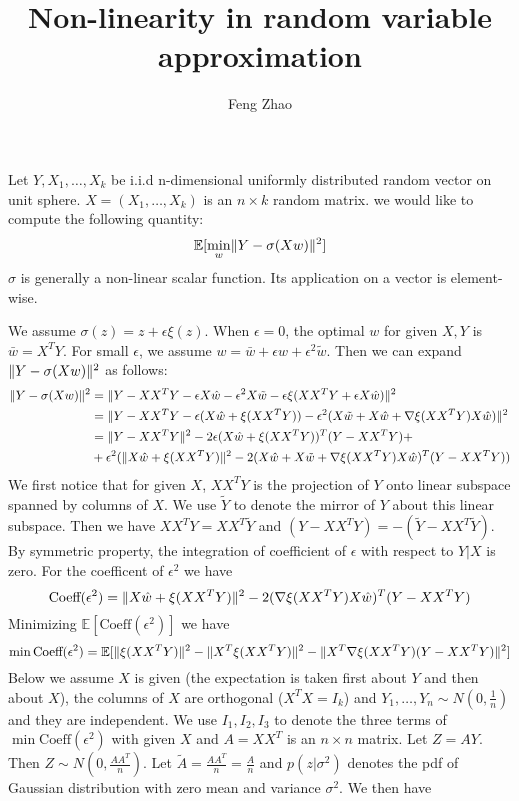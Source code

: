 \documentclass{article}
\title{Non-linearity in random variable approximation}
\author{Feng Zhao}
\DeclarePairedDelimiter\norm{\lVert}{\rVert}
\def\E{\mathbb{E}}
\begin{document}
\maketitle
Let $Y, X_1, \dots, X_k$ be i.i.d n-dimensional uniformly distributed random vector on unit sphere. $X=(X_1, \dots, X_k)$ is an $n\times k$ random matrix. we would like to compute the following quantity:
\begin{equation}
\E[\min_w \norm{Y - \sigma (X w ) }^2]
\end{equation}
$\sigma$ is generally a non-linear scalar function. Its application on a vector is element-wise.

We assume $\sigma(z) = z + \epsilon \xi(z)$. When $\epsilon = 0$, the optimal $w$ for given $X, Y$ is 
$\bar{w} = X^T Y $. For small $\epsilon$, we assume $ w = \bar{w} + \epsilon \hat{w} + \epsilon^2 \tilde{w}$. Then we can expand $\norm{Y - \sigma (X w ) }^2$ as follows:
\begin{align*}
\norm{Y - \sigma (X w ) }^2 & = \norm{Y - XX^T Y - \epsilon X \hat{w} - \epsilon^2 X \tilde{w} - \epsilon \xi(XX^T Y + \epsilon X\hat{w}) }^2 \\
& = \norm{ Y - XX^T Y - \epsilon (X\hat{w} + \xi(XX^T Y)) - \epsilon^2(X\tilde{w} + X\hat{w} + \nabla \xi(XX^TY)X\hat{w})}^2 \\
& = \norm{Y-XX^T Y }^2 - 2 \epsilon (X \hat{w} + \xi(XX^TY))^T (Y-XX^TY) +\\
& +\epsilon^2(\norm{X\hat{w} + \xi(XX^TY)}^2 - 2 (X\hat{w} + X \tilde{w}+ \nabla \xi(XX^TY)X\hat{w})^T(Y-XX^TY))
\end{align*}
We first notice that for given $X$, $XX^TY$ is the projection of $Y$ onto linear subspace spanned by columns of $X$. We use $\tilde{Y}$ to denote the mirror of $Y$ about this linear subspace. Then we have
$XX^T Y = XX^T \tilde{Y}$ and $(Y- XX^TY) = -(\tilde{Y} - XX^T \tilde{Y})$. By symmetric property, the integration of coefficient of $\epsilon$ with respect to $Y|X$ is zero. For the coefficent of $\epsilon^2$ we have
\begin{equation*}
\textrm{Coeff}(\epsilon^2)  =  \norm{X\hat{w} + \xi(XX^TY)}^2 - 2 (\nabla \xi(XX^TY)X\hat{w})^T(Y-XX^TY)
\end{equation*}
Minimizing $\E[\textrm{Coeff}(\epsilon^2)]$ we have
\begin{equation}
\min \textrm{Coeff}(\epsilon^2) = \E[\norm{\xi(XX^TY)}^2 - \norm{X^T\xi(XX^TY)}^2 - \norm{X^T \nabla\xi(XX^TY)(Y-XX^TY)}^2]
\end{equation}
Below we assume $X$ is given (the expectation is taken first about $Y$ and then about $X$), the columns of $X$ are orthogonal ($X^TX=I_k$) and $Y_1, \dots, Y_n  \sim N(0, \frac{1}{n})$ and they are independent. We use $I_1, I_2, I_3$ to denote the three terms of $\min \textrm{Coeff}(\epsilon^2)$ with given $X$ and $A=XX^T$ is an $n\times n$ matrix. Let $Z = AY$. Then $Z \sim N(0, \frac{AA^T}{n})$. Let $\widetilde{A} = \frac{AA^T}{n} = \frac{A}{n}$ and $p(z| \sigma^2)$ denotes the pdf of Gaussian distribution with zero mean and variance $\sigma^2$. We then have
\end{document}
